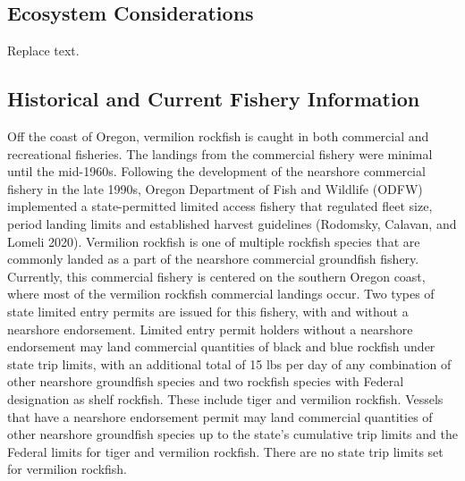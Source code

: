 \documentclass[11pt,
  english,
  a4paper,
]{article}
\begin{document}
\leavevmode\tagmcend\tagstructend\par


\hypertarget{ecosystem-considerations}{%
\subsection{Ecosystem Considerations}\label{ecosystem-considerations}}

\leavevmode\tagmcend\tagstructend


Replace text.

\leavevmode\tagmcend\tagstructend\par


\hypertarget{historical-and-current-fishery-information}{%
\subsection{Historical and Current Fishery Information}\label{historical-and-current-fishery-information}}

\leavevmode\tagmcend\tagstructend


Off the coast of Oregon, vermilion rockfish is caught in both commercial and recreational fisheries. The landings from the commercial fishery were minimal until the mid-1960s. Following the development of the nearshore commercial fishery in the late 1990s, Oregon Department of Fish and Wildlife (ODFW) implemented a state-permitted limited access fishery that regulated fleet size, period landing limits and established harvest guidelines (Rodomsky, Calavan, and Lomeli 2020). Vermilion rockfish is one of multiple rockfish species that are commonly landed as a part of the nearshore commercial groundfish fishery. Currently, this commercial fishery is centered on the southern Oregon coast, where most of the vermilion rockfish commercial landings occur. Two types of state limited entry permits are issued for this fishery, with and without a nearshore endorsement. Limited entry permit holders without a nearshore endorsement may land commercial quantities of black and blue rockfish under state trip limits, with an additional total of 15 lbs per day of any combination of other nearshore groundfish species and two rockfish species with Federal designation as shelf rockfish. These include tiger and vermilion rockfish. Vessels that have a nearshore endorsement permit may land commercial quantities of other nearshore groundfish species up to the state's cumulative trip limits and the Federal limits for tiger and vermilion rockfish. There are no state trip limits set for vermilion rockfish.
\end{document}
